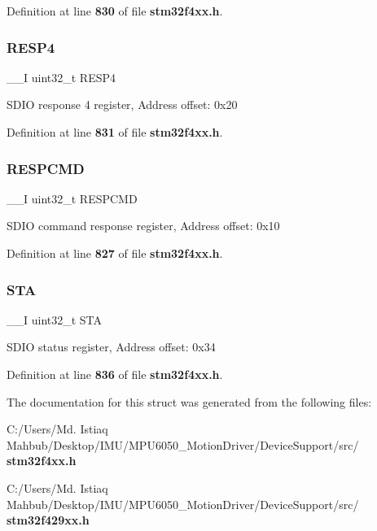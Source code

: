Definition at line \textbf{ 830} of file \textbf{ stm32f4xx.\+h}.

\mbox{\label{structSDIO__TypeDef_ac760383de212de696f504e744c6fca7e}} 
\subsubsection{R\+E\+S\+P4}
{\footnotesize\ttfamily \+\_\+\+\_\+I uint32\+\_\+t R\+E\+S\+P4}

S\+D\+IO response 4 register, Address offset\+: 0x20 

Definition at line \textbf{ 831} of file \textbf{ stm32f4xx.\+h}.

\mbox{\label{structSDIO__TypeDef_aad371db807e2db4a2edf05b3f2f4b6cd}} 
\subsubsection{R\+E\+S\+P\+C\+MD}
{\footnotesize\ttfamily \+\_\+\+\_\+I uint32\+\_\+t R\+E\+S\+P\+C\+MD}

S\+D\+IO command response register, Address offset\+: 0x10 

Definition at line \textbf{ 827} of file \textbf{ stm32f4xx.\+h}.

\mbox{\label{structSDIO__TypeDef_a7520cdf6f3df68c2f147bdd87fb8a96f}} 
\subsubsection{S\+TA}
{\footnotesize\ttfamily \+\_\+\+\_\+I uint32\+\_\+t S\+TA}

S\+D\+IO status register, Address offset\+: 0x34 

Definition at line \textbf{ 836} of file \textbf{ stm32f4xx.\+h}.



The documentation for this struct was generated from the following files\+:\begin{DoxyCompactItemize}
\item 
C\+:/\+Users/\+Md. Istiaq Mahbub/\+Desktop/\+I\+M\+U/\+M\+P\+U6050\+\_\+\+Motion\+Driver/\+Device\+Support/src/\textbf{ stm32f4xx.\+h}\item 
C\+:/\+Users/\+Md. Istiaq Mahbub/\+Desktop/\+I\+M\+U/\+M\+P\+U6050\+\_\+\+Motion\+Driver/\+Device\+Support/src/\textbf{ stm32f429xx.\+h}\end{DoxyCompactItemize}
